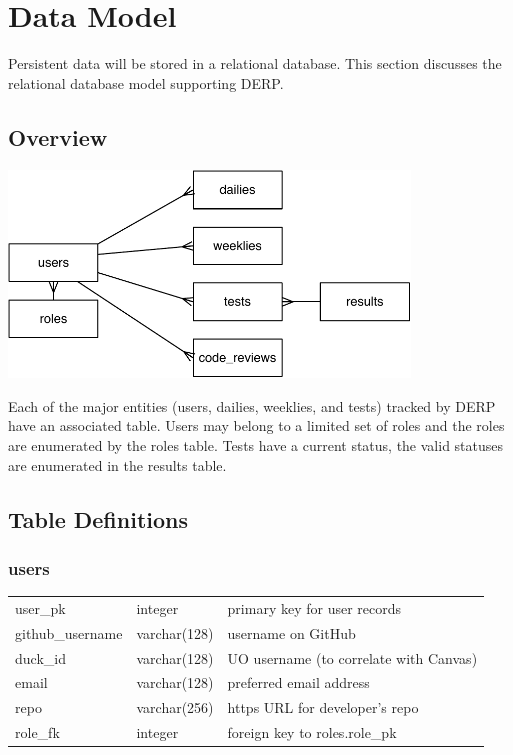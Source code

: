 \chapter*{Data Model}
Persistent data will be stored in a relational database. This section discusses the relational database model supporting DERP.

\section*{Overview}
\begin{center}
\includegraphics[width=0.8\textwidth]{./erd.pdf}
\end{center}

Each of the major entities (users, dailies, weeklies, and tests) tracked by DERP have an associated table. Users may belong to a limited set of roles and the roles are enumerated by the roles table. Tests have a current status, the valid statuses are enumerated in the results table.

\section*{Table Definitions}
\subsection*{users}
\begin{tabular}{l|l|l}
\hline
user\_pk & integer & primary key for user records \\
github\_username & varchar(128) & username on GitHub \\
duck\_id & varchar(128) & UO username (to correlate with Canvas) \\
email & varchar(128) & preferred email address \\
repo & varchar(256) & https URL for developer's repo \\
role\_fk & integer & foreign key to roles.role\_pk \\
\hline
\end{tabular}

